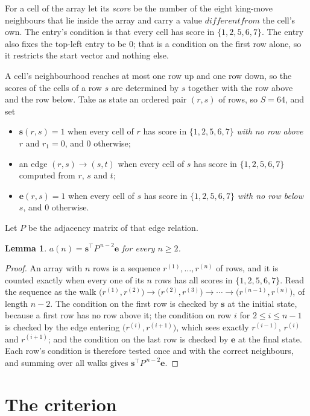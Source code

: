 \documentclass[11pt,a4paper]{article}
\theoremstyle{plain}
\newtheorem{lemma}[theorem]{Lemma}
\theoremstyle{definition}
\begin{document}
For a cell of the array let its \emph{score} be the number of the eight king-move neighbours that lie inside
the array and carry a value $different from$ the cell's own. The entry's condition is that every cell
has score in $\{1,2,5,6,7\}$. The entry also fixes the top-left entry to be $0$; that is a condition on the first row alone, so it restricts the start vector and nothing else.

A cell's neighbourhood reaches at most one row up and one row down, so the scores of the
cells of a row $s$ are determined by $s$ together with the row above and the row below.
Take as state an ordered pair $(r,s)$ of rows, so $S=64$, and set
\begin{itemize}
\item $\mathbf{s}(r,s)=1$ when every cell of $r$ has score in $\{1,2,5,6,7\}$ \emph{with no row
above $r$} and $r_1=0$, and $0$ otherwise;
\item an edge $(r,s)\to(s,t)$ when every cell of $s$ has score in $\{1,2,5,6,7\}$ computed from
$r$, $s$ and $t$;
\item $\mathbf{e}(r,s)=1$ when every cell of $s$ has score in $\{1,2,5,6,7\}$ \emph{with no row
below $s$}, and $0$ otherwise.
\end{itemize}
Let $P$ be the adjacency matrix of that edge relation.

\begin{lemma}\label{lem:walk}
$a(n)=\mathbf{s}^{\!\top}P^{\,n-2}\mathbf{e}$ for every $n\ge2$.
\end{lemma}

\begin{proof}
An array with $n$ rows is a sequence $r^{(1)},\dots,r^{(n)}$ of rows, and it is counted
exactly when every one of its $n$ rows has all scores in $\{1,2,5,6,7\}$. Read the sequence as the
walk $\bigl(r^{(1)},r^{(2)}\bigr)\to\bigl(r^{(2)},r^{(3)}\bigr)\to\cdots\to
\bigl(r^{(n-1)},r^{(n)}\bigr)$, of length $n-2$. The condition on the first row is
checked by $\mathbf{s}$ at the initial state, because a first row has no row above it; the
condition on row $i$ for $2\le i\le n-1$ is checked by the edge entering
$\bigl(r^{(i)},r^{(i+1)}\bigr)$, which sees exactly $r^{(i-1)}$, $r^{(i)}$ and
$r^{(i+1)}$; and the condition on the last row is checked by $\mathbf{e}$ at the final
state. Each row's condition is therefore tested once and with the correct neighbours, and
summing over all walks gives $\mathbf{s}^{\!\top}P^{\,n-2}\mathbf{e}$.
\end{proof}

\section{The criterion}
\end{document}
